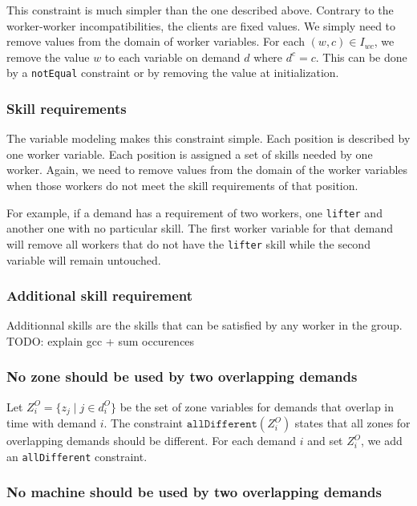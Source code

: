 \documentclass[../../thesis.tex]{subfiles}
\begin{document}
This constraint is much simpler than the one described above. Contrary to the worker-worker incompatibilities,
the clients are fixed values. 
We simply need to remove values 
from the domain of worker variables. For each $(w, c) \in I_{wc}$, we remove the value $w$ to each variable on 
demand $d$ where $d^c = c$. This can be done by a \texttt{notEqual} constraint or by removing the value at initialization.

\subsubsection{Skill requirements}

The variable modeling makes this constraint simple. Each position is described by one worker variable.
Each position is assigned a set of skills needed by one worker. Again, we need to remove values 
from the domain of the worker variables when those workers do not meet the skill requirements of that position. 

For example, if a demand has a requirement of two workers, one \texttt{lifter} and another one with no particular skill. 
The first worker variable for that demand will remove all workers that do not have the \texttt{lifter} skill while the second variable will remain untouched.

\subsubsection{Additional skill requirement}

Additionnal skills are the skills that can be satisfied by any worker in the group.
TODO: explain gcc + sum occurences

\subsubsection{No zone should be used by two overlapping demands}

Let $Z^O_i = \{ z_j \mid j \in d^O_i \}$ be the set of zone variables for demands that overlap in time with demand $i$.
The constraint $\texttt{allDifferent}(Z^O_i)$ states that all zones for overlapping demands 
should be different. For each demand $i$ and set $Z^O_i$, we add an \texttt{allDifferent} constraint.

\subsubsection{No machine should be used by two overlapping demands}
\end{document}
